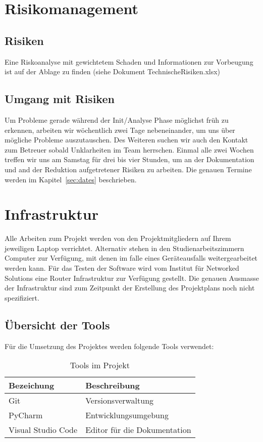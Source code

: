 \documentclass[
	ngerman,
	toc=listof, %
	toc=bibliography, %
	footnotes=multiple, %
	parskip=half, %
	numbers=noendperiod %
]{scrartcl}
\begin{document}
\section{Risikomanagement}
\label{sec:risikomanagement}

	\subsection{Risiken}
		Eine Riskoanalyse mit gewichtetem Schaden und Informationen zur Vorbeugung ist auf der Ablage zu
		finden (siehe Dokument TechnischeRisiken.xlsx)

	\subsection{Umgang mit Risiken}
		Um Probleme gerade während der Init/Analyse Phase möglichst früh zu erkennen, 
		arbeiten wir wöchentlich zwei Tage nebeneinander, um uns über mögliche Probleme auszutauschen. 
		Des Weiteren suchen wir auch den Kontakt zum Betreuer sobald Unklarheiten im Team herrschen.
		Einmal alle zwei Wochen treffen wir uns am Samstag für drei bis vier Stunden, um an der Dokumentation und and der Reduktion aufgetretener Risiken zu arbeiten. 
		Die genauen Termine werden im Kapitel~\ref{sec:dates} beschrieben.

\section{Infrastruktur}
	Alle Arbeiten zum Projekt werden von den Projektmitgliedern auf Ihrem jeweiligen Laptop verrichtet.
	Alternativ stehen in den Studienarbeitszimmern Computer zur Verfügung, mit denen im falle eines Geräteausfalls weitergearbeitet werden kann.
	Für das Testen der Software wird vom Institut für Networked Solutions eine Router Infrastruktur zur Verfügung gestellt.
	Die genauen Ausmasse der Infrastruktur sind zum Zeitpunkt der Erstellung des Projektplans noch nicht spezifiziert.

	\subsection{Übersicht der Tools}
		Für die Umsetzung des Projektes werden folgende Tools verwendet: \\[2ex]
		\begin{table}[!h]
			\begin{tabularx}{0.9\linewidth}{lX}
				\toprule
				Bezeichung & Beschreibung \\
				\midrule
				Git & Versionsverwaltung \\
				PyCharm & Entwicklungsumgebung \\
				Visual Studio Code & Editor für die Dokumentation\\
				\bottomrule
			\end{tabularx}
		\caption{Tools im Projekt}
		\end{table}
		
\end{document}
